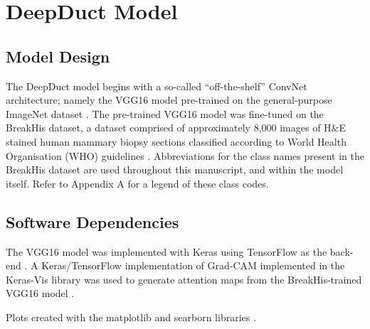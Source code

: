 

\section{DeepDuct Model}
\subsection{Model Design}
The DeepDuct model begins with a so-called ``off-the-shelf'' ConvNet architecture; namely the VGG16 model pre-trained on the general-purpose ImageNet dataset \citep{simonyan2014,deng2009,imagenet}. The pre-trained VGG16 model was fine-tuned on the BreakHis dataset, a dataset comprised of approximately 8,000 images of H\&E stained human mammary biopsy sections classified according to World Health Organisation (WHO) guidelines \citep{spanhol2016, who_breast}. Abbreviations for the class names present in the BreakHis dataset are used throughout this manuscript, and within the model itself. Refer to Appendix A for a legend of these class codes. \par
\subsection{Software Dependencies}
The VGG16 model was implemented with Keras using TensorFlow as the back-end \citep{chollet2015, tensorflow}. A Keras/TensorFlow implementation of Grad-CAM implemented in the Keras-Vis library was used to generate attention maps from the BreakHis-trained VGG16 model \citep{raghakot}.\par

Plots created with the matplotlib and searborn libraries \citep{hunter2007, seaborn}.


